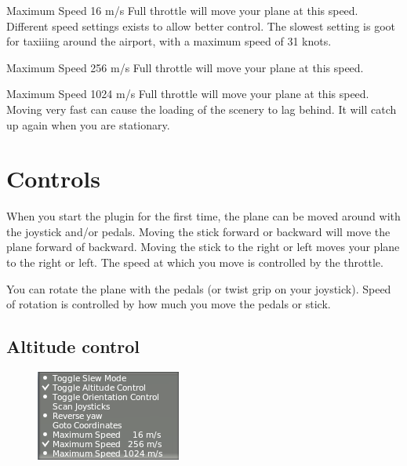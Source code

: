 \documentclass[a4paper,12pt]{article}
\newenvironment{vlist}[1]{%
\begin{list}{}{%
    \settowidth{\labelwidth}{\tt #1 }     %
    \setlength{\leftmargin}{\labelwidth}  %
    \addtolength{\leftmargin}{\labelsep}  %
    \setlength{\parsep}{0.5ex plus 0.2ex minus 0.2ex}
    \setlength{\itemsep}{0.3ex}
    \renewcommand{\makelabel}[1]{\color{headings}\tt ##1 \color{text1}\hfill}}}%
{\end{list}}
\begin{document}
\begin{vlist}{w}
\item[Maximum Speed 16 m/s] Full throttle will move your plane at this
  speed. Different speed settings exists to allow better control. The
  slowest setting is goot for taxiiing around the airport, with a
  maximum speed of 31 knots.

\item[Maximum Speed 256 m/s] Full throttle will move your plane at this
  speed. 

\item[Maximum Speed 1024 m/s] Full throttle will move your plane at this
  speed. Moving very fast can cause the loading of the scenery to lag
  behind. It will catch up again when you are stationary.

\end{vlist}{}
\section*{Controls}

When you start the plugin for the first time, the plane can be moved
around with the joystick and/or pedals. Moving the stick forward or
backward will move the plane forward of backward. Moving the stick to
the right or left moves your plane to the right or left.  The speed at
which you move is controlled by the throttle.

\vspace{0.5\baselineskip}
You can rotate the plane with the pedals (or twist grip on your
joystick). Speed of rotation is controlled by how much you move the
pedals or stick.


\subsection*{Altitude control}

\begin{figure}[h!]%
\centering
\includegraphics[scale=1]{slewaltitude.png}
\label{fig:infowindow}
\end{figure}
\end{document}
